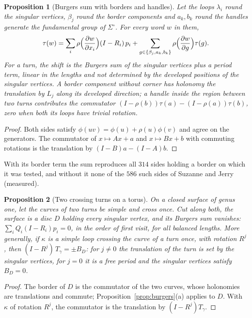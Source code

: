 \documentclass[11pt,a4paper]{article}
\newtheorem{proposition}{Proposition}
\newcommand{\lean}[1]{\texttt{\detokenize{#1}}}
\newenvironment{evidence}[3][]{}{}
\begin{document}
\begin{evidence}{core}{\lean{fox_general}, \lean{holGen_rotations}, \lean{commutator_motion}; assumed: the presentation of the fundamental group by the loops named}
\begin{proposition}[Burgers sum with borders and handles]\label{prop:burgers-any}
Let the loops $\lambda_i$ round the singular vertices, $\beta_j$ round the
border components and $a_k, b_k$ round the handles generate the fundamental
group of $\Sigma^\circ$. For every word $w$ in them,
\[
  \tau(w) = \sum_i \rho\Bigl(\frac{\partial w}{\partial x_i}\Bigr)(I - R_i)\,p_i
  + \sum_{g \in \{\beta_j, a_k, b_k\}} \rho\Bigl(\frac{\partial w}{\partial g}\Bigr)\tau(g).
\]
For a turn, the shift is the Burgers sum of the singular vertices plus a
\emph{period term}, linear in the lengths and not determined by the developed
positions of the singular vertices. A border component without corner has
holonomy the translation by $L_j$ along its developed direction; a handle
inside the region between two turns contributes the commutator $(I -
\rho(b))\tau(a) - (I - \rho(a))\tau(b)$, zero when both its loops have trivial
rotation.
\end{proposition}
\end{evidence}
\begin{proof}
Both sides satisfy $\phi(uv) = \phi(u) + \rho(u)\phi(v)$ and agree on the
generators. The commutator of $x \mapsto Ax + a$ and $x \mapsto Bx + b$ with
commuting rotations is the translation by $(I - B)a - (I - A)b$.
\end{proof}

With its border term the sum reproduces all $314$ sides holding a border on
which it was tested, and without it none of the $586$ such sides of Suzanne
and Jerry (measured).

\begin{evidence}{core}{\lean{commutator_translation}, \lean{commutator_translations}; assumed: the border of the cut disc is the commutator of the two curves}
\begin{proposition}[Two crossing turns on a torus]\label{prop:torus}
On a closed surface of genus one, let the curves of two turns be simple and
cross once. Cut along both, the surface is a disc $D$ holding every singular
vertex, and its Burgers sum vanishes: $\sum_i Q_i (I - R_i) p_i = 0$, in the
order of first visit, for all balanced lengths. More generally, if $\kappa$ is
a simple loop crossing the curve of a turn once, with rotation $R^j$, then $(I
- R^j)\,T_\gamma = \pm B_D$: for $j \neq 0$ the translation of the turn is set
by the singular vertices, for $j = 0$ it is a free period and the singular
vertices satisfy $B_D = 0$.
\end{proposition}
\end{evidence}
\begin{proof}
The border of $D$ is the commutator of the two curves, whose holonomies are
translations and commute; Proposition~\ref{prop:burgers}(a) applies to $D$.
With $\kappa$ of rotation $R^j$, the commutator is the translation by $(I -
R^j)T_\gamma$.
\end{proof}
\end{document}
